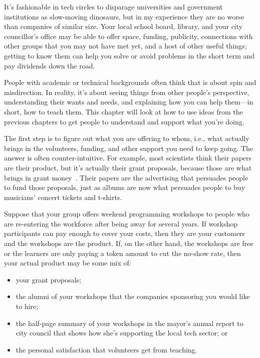 
It's fashionable in tech circles
to disparage universities and government institutions as slow-moving dinosaurs,
but in my experience they are no worse than companies of similar size.
Your local school board, library, and your city councillor's office
may be able to offer space, funding, publicity,
connections with other groups that you may not have met yet,
and a host of other useful things;
getting to know them can help you solve or avoid problems in the short term
and pay dividends down the road.


People with academic or technical backgrounds often think that
 is about spin and misdirection.
In reality,
it's about seeing things from other people's perspective,
understanding their wants and needs,
and explaining how you can help them---in short,
how to teach them.
This chapter will look at how to use ideas from the previous chapters
to get people to understand and support what you're doing.

The first step is to figure out what you are offering to whom,
i.e.,
what actually brings in the volunteers,
funding,
and other support you need to keep going.
The answer is often counter-intuitive.
For example,
most scientists think their papers are their product,
but it's actually their grant proposals,
because those are what brings in grant money~\cite{Kuch2011}.
Their papers are the advertising that persuades people to fund those proposals,
just as albums are now what persuades people to buy musicians' concert tickets and t-shirts.

Suppose that your group offers weekend programming workshops
to people who are re-entering the workforce after being away for several years.
If workshop participants can pay enough to cover your costs,
then they are your customers and the workshops are the product.
If,
on the other hand,
the workshops are free or the learners are only paying a token amount to cut the no-show rate,
then your actual product may be some mix of:

\begin{itemize}

\item
  your grant proposals;

\item
  the alumni of your workshops
  that the companies sponsoring you would like to hire;

\item
  the half-page summary of your workshops in the mayor's annual report to city council
  that shows how she's supporting the local tech sector;
  or

\item
  the personal satisfaction that volunteers get from teaching.

\end{itemize}


